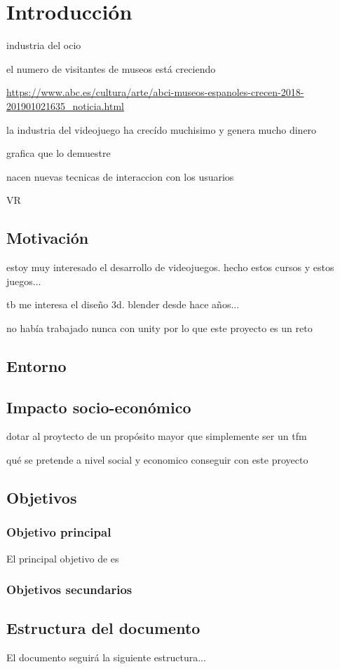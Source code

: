 \chapter{Introducción}
\label{chap:introduccion}

industria del ocio

el numero de visitantes de museos está creciendo

\url{https://www.abc.es/cultura/arte/abci-museos-espanoles-crecen-2018-201901021635_noticia.html}

la industria del videojuego ha crecído muchisimo y genera mucho dinero

grafica que lo demuestre

nacen nuevas tecnicas de interaccion con los usuarios

VR


\section{Motivación}

estoy muy interesado el desarrollo de videojuegos. hecho estos cursos y estos juegos...

tb me interesa el diseño 3d. blender desde hace años...

no había trabajado nunca con unity por lo que este proyecto es un reto

\section{Entorno}

\section{Impacto socio-económico}

dotar al proytecto de un propósito mayor que simplemente ser un tfm

qué se pretende a nivel social y economico conseguir con este proyecto

\section{Objetivos}

\subsection{Objetivo principal}

El principal objetivo de \MineRVa es 

\subsection{Objetivos secundarios}

\section{Estructura del documento}

El documento seguirá la siguiente estructura...